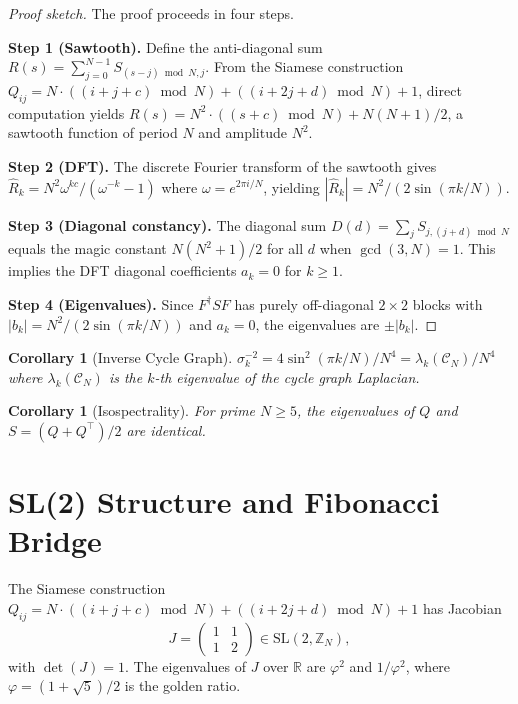 \documentclass[aps,prd,twocolumn,superscriptaddress,floatfix,nofootinbib]{revtex4-2}
\newtheorem{corollary}[theorem]{Corollary}
\theoremstyle{definition}
\theoremstyle{remark}
\begin{document}
\begin{proof}[Proof sketch]
The proof proceeds in four steps.

\textbf{Step 1 (Sawtooth).} Define the anti-diagonal sum
$R(s) = \sum_{j=0}^{N-1} S_{(s-j) \bmod N, j}$.
From the Siamese construction $Q_{ij} = N \cdot ((i+j+c) \bmod N) + ((i+2j+d) \bmod N) + 1$,
direct computation yields
$R(s) = N^2 \cdot ((s+c) \bmod N) + N(N+1)/2$,
a sawtooth function of period $N$ and amplitude $N^2$.

\textbf{Step 2 (DFT).} The discrete Fourier transform of the sawtooth gives
$\hat{R}_k = N^2 \omega^{kc}/(\omega^{-k} - 1)$
where $\omega = e^{2\pi i/N}$, yielding $|\hat{R}_k| = N^2/(2\sin(\pi k/N))$.

\textbf{Step 3 (Diagonal constancy).} The diagonal sum
$D(d) = \sum_j S_{j,(j+d) \bmod N}$
equals the magic constant $N(N^2+1)/2$ for all $d$ when $\gcd(3,N)=1$.
This implies the DFT diagonal coefficients $a_k = 0$ for $k \geq 1$.

\textbf{Step 4 (Eigenvalues).} Since $F^\dagger S F$ has purely off-diagonal
$2 \times 2$ blocks with $|b_k| = N^2/(2\sin(\pi k/N))$ and $a_k = 0$,
the eigenvalues are $\pm |b_k|$.
\end{proof}

\begin{corollary}[Inverse Cycle Graph]\label{cor:cycle-graph}
$\sigma_k^{-2} = 4\sin^2(\pi k/N)/N^4 = \lambda_k(\mathcal{C}_N)/N^4$
where $\lambda_k(\mathcal{C}_N)$ is the $k$-th eigenvalue of the cycle graph Laplacian.
\end{corollary}

\begin{corollary}[Isospectrality]\label{cor:isospectrality}
For prime $N \geq 5$, the eigenvalues of $Q$ and $S = (Q+Q^\top)/2$ are identical.
\end{corollary}

\section{SL(2) Structure and Fibonacci Bridge}
\label{sec:sl2-fibonacci}

The Siamese construction $Q_{ij} = N\cdot((i+j+c) \bmod N) + ((i+2j+d) \bmod N) + 1$
has Jacobian
\begin{equation}
J = \begin{pmatrix} 1 & 1 \\ 1 & 2 \end{pmatrix} \in \mathrm{SL}(2, \mathbb{Z}_N),
\end{equation}
with $\det(J) = 1$. The eigenvalues of $J$ over $\mathbb{R}$ are $\varphi^2$ and $1/\varphi^2$,
where $\varphi = (1+\sqrt{5})/2$ is the golden ratio.
\end{document}
